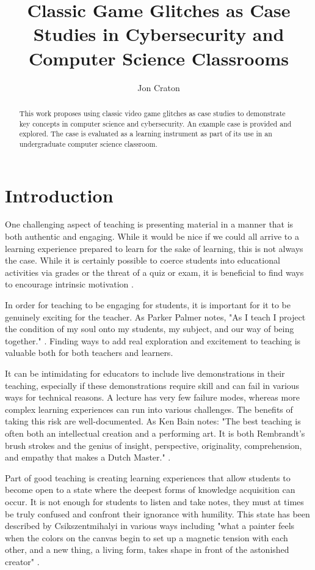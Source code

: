 \documentclass[letterpaper]{article}
\title{Classic Game Glitches as Case Studies in Cybersecurity and Computer Science Classrooms}
\author[1]{Jon Craton}
\affil[1]{Anderson University, Anderson, IN}
\date{} %
\begin{document}
\maketitle

\begin{abstract}
This work proposes using classic video game glitches as case studies to demonstrate key concepts in computer science and cybersecurity. An example case is provided and explored. The case is evaluated as a learning instrument as part of its use in an undergraduate computer science classroom.
\end{abstract}

\section{Introduction}
One challenging aspect of teaching is presenting material in a manner that is both authentic and engaging. While it would be nice if we could all arrive to a learning experience prepared to learn for the sake of learning, this is not always the case. While it is certainly possible to coerce students into educational activities via grades or the threat of a quiz or exam, it is beneficial to find ways to encourage intrinsic motivation \cite{deci2013intrinsic}.

In order for teaching to be engaging for students, it is important for it to be genuinely exciting for the teacher. As Parker Palmer notes, "As I teach I project the condition of my soul onto my students, my subject, and our way of being together." \cite{palmer2000courage}. Finding ways to add real exploration and excitement to teaching is valuable both for both teachers and learners.

It can be intimidating for educators to include live demonstrations in their teaching, especially if these demonstrations require skill and can fail in various ways for technical reasons. A lecture has very few failure modes, whereas more complex learning experiences can run into various challenges. The benefits of taking this risk are well-documented. As Ken Bain notes: "The best teaching is often both an intellectual creation and a performing art. It is both Rembrandt’s brush strokes and the genius of insight, perspective, originality, comprehension, and empathy that makes a Dutch Master." \cite{bain2004best}.

Part of good teaching is creating learning experiences that allow students to become open to a state where the deepest forms of knowledge acquisition can occur. It is not enough for students to listen and take notes, they must at times be truly confused and confront their ignorance with humility. This state has been described by Csikszentmihalyi in various ways including  "what a painter feels when the colors on the canvas begin to set up a magnetic tension with each other, and a new thing, a living form, takes shape in front of the astonished creator" \cite{csikszentmihalyi1990flow}.
\end{document}

